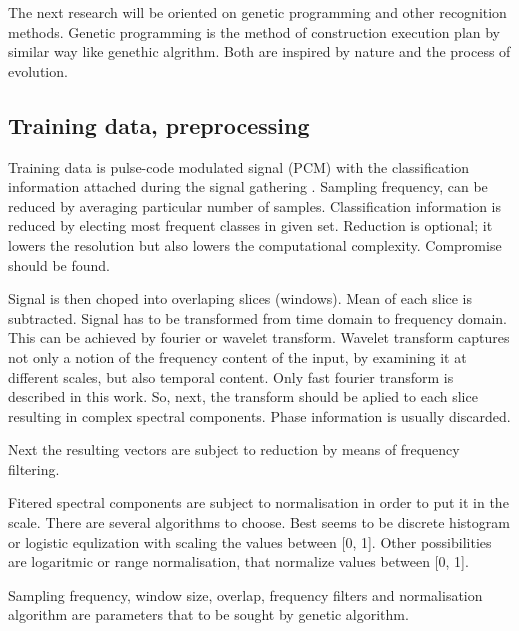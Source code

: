 \documentclass[a4paper]{IEEEtran}
\begin{document}
The next research will be oriented on genetic programming and other 
recognition methods. Genetic programming 
is the method of construction execution plan by similar way like genethic
algrithm. Both are inspired by nature and the process of evolution.


\subsection{Training data, preprocessing}
Training data is pulse-code modulated signal (PCM) with the classification 
information attached during the signal gathering \cite{pcm}. 
Sampling frequency,
can be reduced by averaging particular number of samples. Classification
information is reduced by electing most frequent classes in given set.
Reduction is optional; it lowers the resolution but also lowers the 
computational complexity. Compromise should be found.

Signal is then choped into overlaping slices (windows). 
Mean of each slice is subtracted. %
Signal has to be transformed %
from time domain to frequency domain.
This can be achieved by fourier or wavelet transform\cite{fourier,wavelet}.  %
Wavelet transform captures not only a notion of the frequency content of the input,
by examining it at different scales, but also temporal content.
Only fast fourier transform is described in this work.
So, next, the transform should be aplied to each slice resulting in
complex spectral components.
Phase information is usually discarded.

Next the resulting vectors are subject to reduction by means of
frequency filtering.%

Fitered spectral components are subject to normalisation in order to put it
in the scale. There are several algorithms to choose. Best seems to be 
discrete histogram or logistic equlization with scaling the values between [0, 1].
Other possibilities are logaritmic or range normalisation, that normalize
values between [0, 1]. %

Sampling frequency, window size, overlap, frequency filters and 
normalisation algorithm
are parameters that to be sought by genetic algorithm.
\end{document}
